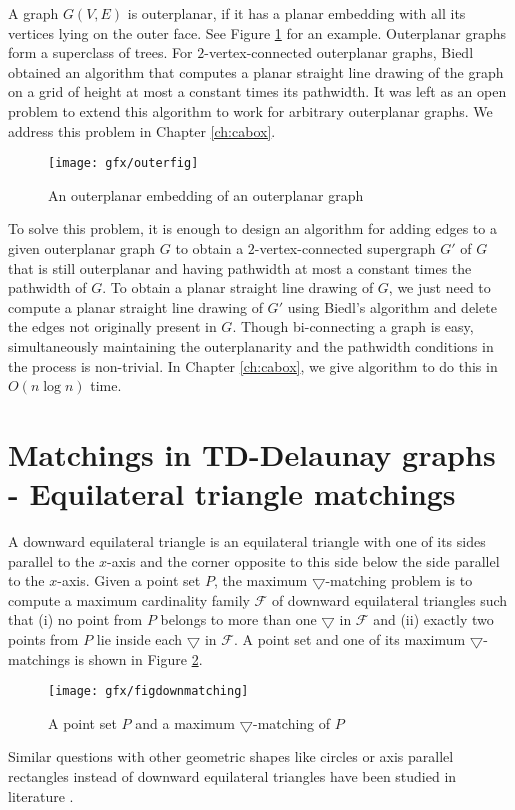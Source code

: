 A graph $G(V, E)$ is outerplanar, if it has a planar embedding with all its vertices lying on the outer face. See Figure \ref{Figouter1} for an example. 
Outerplanar graphs form a superclass of trees. For $2$-vertex-connected outerplanar graphs, Biedl \cite{Biedl2012} obtained an algorithm that computes 
a planar straight line drawing of the graph on a grid of height at most a constant times its pathwidth. It was left as an open problem to extend this algorithm
to work for arbitrary outerplanar graphs. We address this problem in Chapter \ref{ch:cabox}.

\begin{figure}
\begin{center}
\texttt{[image: gfx/outerfig]}
\caption{An outerplanar embedding of an outerplanar graph}
\label{Figouter1}
\end{center}
\end{figure}

To solve this problem, it is enough to design an algorithm for adding edges to a given outerplanar graph $G$ to obtain a $2$-vertex-connected supergraph $G'$ of $G$ 
that is still outerplanar and having pathwidth at most a constant times the pathwidth of $G$. To obtain a  planar straight line drawing of $G$, we just need to compute a planar straight line drawing of $G'$ using Biedl's algorithm and delete the edges not originally present in $G$. Though bi-connecting a graph is easy, simultaneously
maintaining the outerplanarity and the pathwidth conditions in the process is non-trivial. In Chapter \ref{ch:cabox}, we give algorithm to do this in $O(n \log n)$ time.
\section[Matchings in TD-Delaunay graphs]{Matchings in TD-Delaunay graphs - Equilateral triangle matchings}\label{introMatching}
A downward equilateral triangle is an equilateral triangle with one of its sides parallel to the $x$-axis and the corner opposite to this side below the 
side parallel to the $x$-axis. Given a point set $P$, the maximum $\bigtriangledown$-matching problem is to compute a maximum cardinality family $\mathcal{F}$
of downward equilateral triangles such that (i) no point from $P$ belongs to more than one $\bigtriangledown$ in $\mathcal{F}$ and 
(ii) exactly two points from $P$ lie inside each $\bigtriangledown$ in $\mathcal{F}$. 
A point set and one of its maximum $\bigtriangledown$-matchings is shown in Figure \ref{Figdownmatching}. 
\begin{figure}[h]
\centering
  \texttt{[image: gfx/figdownmatching]}   %
  \caption{A point set $P$ and a maximum $\bigtriangledown$-matching of $P$}
\label{Figdownmatching}
  \end{figure}
Similar questions with other geometric shapes like circles or axis parallel rectangles instead of downward equilateral triangles have been studied in 
literature \cite{Abrego2009,Dillencourt1990,Bereg2009}. 


